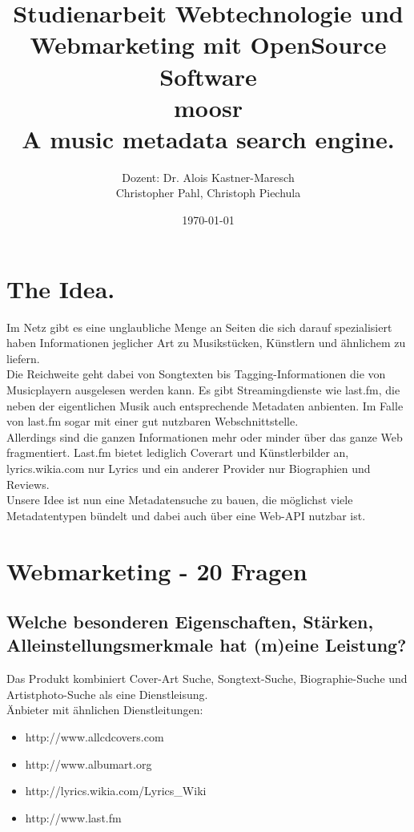\documentclass[11pt]{scrreprt}
\title{Studienarbeit Webtechnologie und Webmarketing mit OpenSource Software \\
    \textcolor{WildStrawberry}{\huge{moosr}} \\
    \normalsize{A music metadata search engine.}
}
\author{Dozent: Dr. Alois Kastner-Maresch\\
Christopher Pahl, Christoph Piechula}
\date{\today}
\begin{document}
\maketitle
\tableofcontents
\chapter{The Idea.}
Im Netz gibt es eine unglaubliche Menge an Seiten die sich darauf spezialisiert
haben Informationen jeglicher Art zu Musikstücken, Künstlern und ähnlichem zu
liefern.
\\
Die Reichweite geht dabei von Songtexten bis Tagging-Informationen die von
Musicplayern ausgelesen werden kann. Es gibt Streamingdienste wie last.fm,
die neben der eigentlichen Musik auch entsprechende Metadaten anbienten. 
Im Falle von last.fm sogar mit einer gut nutzbaren Webschnittstelle.
\\
Allerdings sind die ganzen Informationen mehr oder minder über das ganze Web
fragmentiert. Last.fm bietet lediglich Coverart und Künstlerbilder an, 
lyrics.wikia.com nur Lyrics und ein anderer Provider nur Biographien und
Reviews.
\\
Unsere Idee ist nun eine Metadatensuche zu bauen, die möglichst viele
Metadatentypen bündelt und dabei auch über eine Web-API nutzbar ist.

\chapter{Webmarketing - 20 Fragen}

\section{Welche besonderen Eigenschaften, Stärken,
Alleinstellungsmerkmale hat (m)eine Leistung?}

Das Produkt kombiniert Cover-Art Suche, Songtext-Suche, Biographie-Suche und
Artistphoto-Suche als eine Dienstleisung.
\\
Änbieter mit ähnlichen Dienstleitungen: \\

\begin{itemize}
    \item http://www.allcdcovers.com
    \item http://www.albumart.org
    \item http://lyrics.wikia.com/Lyrics\_Wiki
    \item http://www.last.fm
\end{itemize}
\end{document}
